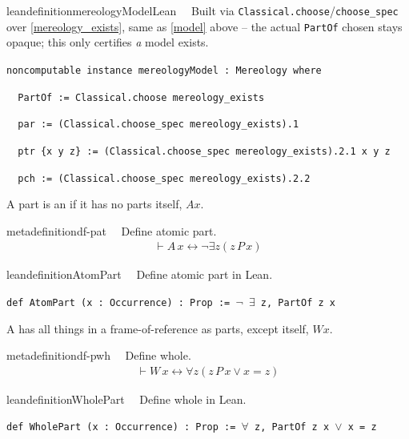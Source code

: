 \begin{restatable}{leandefinition}{mereologyModelLean}~~ Built via
\texttt{Classical.choose}/\texttt{choose\_spec} over \ref{mereology_exists}, same as \ref{model} above --
the actual \texttt{PartOf} chosen stays opaque; this only certifies \emph{a} model exists.

\texttt{\textcolor{leancolor}{noncomputable instance} \textcolor{leanyellow}{mereologyModel} : Mereology \textcolor{leancolor}{where}}

\texttt{~~PartOf := Classical.choose mereology\_exists}

\texttt{~~par := (Classical.choose\_spec mereology\_exists).1}

\texttt{~~ptr \{x y z\} := (Classical.choose\_spec mereology\_exists).2.1 x y z}

\texttt{~~pch := (Classical.choose\_spec mereology\_exists).2.2}
\label{mereologyModel}
\end{restatable}

\pn A part is an  if it has no parts itself, $Ax$.
\begin{restatable}{metadefinition}{df-pat}~~ Define atomic part.
\begin{align}
\vdash A \,x \leftrightarrow \lnot \exists z ( z \,P \,x
    )\label{eq:df-pat}\tag{df-pat}
\end{align}
\end{restatable}

\begin{restatable}{leandefinition}{AtomPart}~~ Define atomic part in Lean.

\texttt{\textcolor{leancolor}{def} \textcolor{leanyellow}{AtomPart} (x : Occurrence) : Prop := $\lnot$ $\exists$ z, PartOf z x}
\label{AtomPart}
\end{restatable}

\pn A  has all things in a frame-of-reference as parts, except itself, $Wx$.
\begin{restatable}{metadefinition}{df-pwh}~~ Define whole.
\begin{align}
\vdash W \,x \leftrightarrow \forall z ( z \,P \,x \vee x = z
    )\label{eq:df-pwh}\tag{df-pwh}
\end{align}
\end{restatable}

\begin{restatable}{leandefinition}{WholePart}~~ Define whole in Lean.

\texttt{\textcolor{leancolor}{def} \textcolor{leanyellow}{WholePart} (x : Occurrence) : Prop := $\forall$ z, PartOf z x $\vee$ x = z}
\label{WholePart}
\end{restatable}

